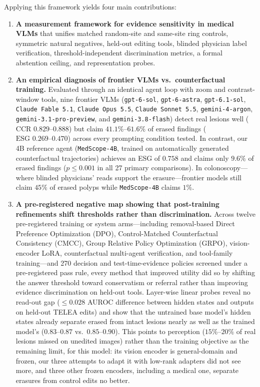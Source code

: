 \documentclass{article} %
\begin{document}
Applying this framework yields four main contributions:
\begin{enumerate}[leftmargin=*,nosep]
    \item \textbf{A measurement framework for evidence sensitivity in medical VLMs} that unifies matched random-site and same-site ring controls, symmetric natural negatives, held-out editing tools, blinded physician label verification, threshold-independent discrimination metrics, a formal abstention ceiling, and representation probes.
    \item \textbf{An empirical diagnosis of frontier VLMs vs.\ counterfactual training.} Evaluated through an identical agent loop with zoom and contrast-window tools, nine frontier VLMs (\texttt{gpt-6-sol}, \texttt{gpt-6-astra}, \texttt{gpt-6.1-sol}, \texttt{Claude Fable 5.1}, \texttt{Claude Opus 5.5}, \texttt{Claude Sonnet 5.5}, \texttt{gemini-4-argon}, \texttt{gemini-3.1-pro-preview}, and \texttt{gemini-3.8-flash}) detect real lesions well ($\text{CCR } 0.829\text{--}0.888$) but claim $41.1\%\text{--}61.6\%$ of erased findings ($\text{ESG } 0.269\text{--}0.470$) across every prompting condition tested. In contrast, our 4B reference agent (\texttt{MedScope-4B}, trained on automatically generated counterfactual trajectories) achieves an ESG of $0.758$ and claims only $9.6\%$ of erased findings ($p \le 0.001$ in all 27 primary comparisons). In colonoscopy---where blinded physicians' reads support the erasure---frontier models still claim $45\%$ of erased polyps while \texttt{MedScope-4B} claims $1\%$.
    \item \textbf{A pre-registered negative map showing that post-training refinements shift thresholds rather than discrimination.} Across twelve pre-registered training or system arms---including removal-based Direct Preference Optimization (DPO), Control-Matched Counterfactual Consistency (CMCC), Group Relative Policy Optimization (GRPO), vision-encoder LoRA, counterfactual multi-agent verification, and tool-family training---and 270 decision and test-time-evidence policies screened under a pre-registered pass rule, every method that improved utility did so by shifting the answer threshold toward conservatism or referral rather than improving evidence discrimination on held-out tools. Layer-wise linear probes reveal no read-out gap ($\le 0.028$ AUROC difference between hidden states and outputs on held-out TELEA edits) and show that the untrained base model's hidden states already separate erased from intact lesions nearly as well as the trained model's ($0.83\text{--}0.87$ vs.\ $0.85\text{--}0.90$). This points to perception ($15\%\text{--}20\%$ of real lesions missed on unedited images) rather than the training objective as the remaining limit, for this model: its vision encoder is general-domain and frozen, our three attempts to adapt it with low-rank adapters did not see more, and three other frozen encoders, including a medical one, separate erasures from control edits no better.

\end{enumerate}
\end{document}
